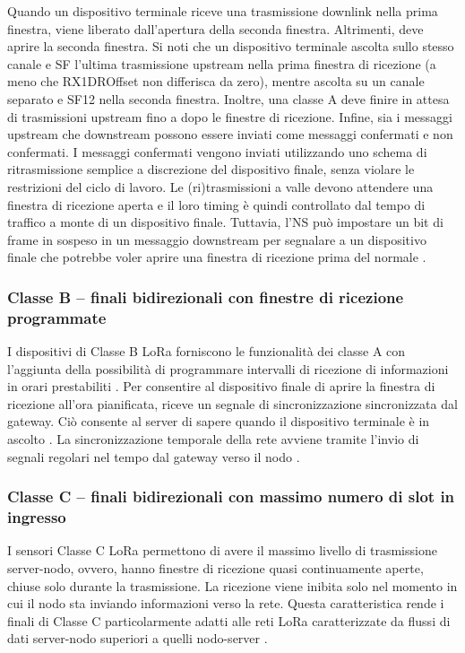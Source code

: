 \documentclass[a4paper]{report} %
\begin{document}
Quando un dispositivo terminale riceve una trasmissione downlink nella prima finestra, viene liberato dall'apertura della seconda finestra. Altrimenti, deve aprire la seconda finestra. Si noti che un dispositivo terminale ascolta sullo stesso canale e SF l'ultima trasmissione upstream nella prima finestra di ricezione (a meno che RX1DROffset non differisca da zero), mentre ascolta su un canale separato e SF12 nella seconda finestra. Inoltre, una classe A deve finire in attesa di trasmissioni upstream fino a dopo le finestre di ricezione. Infine, sia i messaggi upstream che downstream possono essere inviati come messaggi confermati e non confermati. I messaggi confermati vengono inviati utilizzando uno schema di ritrasmissione semplice a discrezione del dispositivo finale, senza violare le restrizioni del ciclo di lavoro. Le (ri)trasmissioni a valle devono attendere una finestra di ricezione aperta e il loro timing è quindi controllato dal tempo di traffico a monte di un dispositivo finale. Tuttavia, l'NS può impostare un bit di frame in sospeso in un messaggio downstream per segnalare a un dispositivo finale che potrebbe voler aprire una finestra di ricezione prima del normale \cite{art:rif.49}.

\subsubsection{Classe B – finali bidirezionali con finestre di ricezione programmate}
I dispositivi di Classe B LoRa forniscono le funzionalità dei classe A con l’aggiunta della possibilità di programmare intervalli di ricezione di informazioni in orari prestabiliti \cite{art:rif.27}. 
Per consentire al dispositivo finale di aprire la finestra di ricezione all'ora pianificata, riceve un segnale di sincronizzazione sincronizzata dal gateway. Ciò consente al server di sapere quando il dispositivo terminale è in ascolto \cite{art:rif.31}. 
La sincronizzazione temporale della rete avviene tramite l’invio di segnali regolari nel tempo dal gateway verso il nodo \cite{art:rif.27}.
\subsubsection{Classe C – finali bidirezionali con massimo numero di slot in ingresso}
I sensori Classe C LoRa permettono di avere il massimo livello di trasmissione server-nodo, ovvero, hanno finestre di ricezione quasi continuamente aperte, chiuse solo durante la trasmissione. La ricezione viene inibita solo nel momento in cui il nodo sta inviando informazioni verso la rete. Questa caratteristica rende i finali di Classe C particolarmente adatti alle reti LoRa caratterizzate da flussi di dati server-nodo superiori a quelli nodo-server \cite{art:rif.27}.
\end{document}
